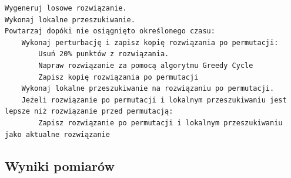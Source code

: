\documentclass[a4paper]{article}
\begin{document}
\begin{lstlisting}
Wygeneruj losowe rozwiązanie.
Wykonaj lokalne przeszukiwanie.
Powtarzaj dopóki nie osiągnięto określonego czasu:
    Wykonaj perturbację i zapisz kopię rozwiązania po permutacji:
        Usuń 20% punktów z rozwiązania.
        Napraw rozwiązanie za pomocą algorytmu Greedy Cycle
        Zapisz kopię rozwiązania po permutacji
    Wykonaj lokalne przeszukiwanie na rozwiązaniu po permutacji.
    Jeżeli rozwiązanie po permutacji i lokalnym przeszukiwaniu jest lepsze niż rozwiązanie przed permutacją:
    	Zapisz rozwiązanie po permutacji i lokalnym przeszukiwaniu jako aktualne rozwiązanie
\end{lstlisting}

\subsection{Wyniki pomiarów}
\end{document}
